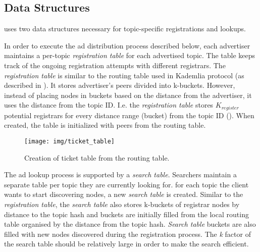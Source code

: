 \subsection{Data Structures}\label{sec:struct}
\sysname uses two data structures necessary for topic-specific registrations and lookups. 

In order to execute the ad distribution process described below,  each advertiser maintains a per-topic \emph{registration table} for each advertised topic. The table keeps track of the ongoing registration attempts with different registrars.  The \emph{registration table} is similar to the routing table used in Kademlia protocol (as described in ). It stores advertiser's peers divided into k-buckets. However, instead of placing nodes in buckets based on the distance from the advertiser, it uses the distance from the topic ID. I.e. the \emph{registration table} stores $K_\textit{register}$ potential registrars for every distance range (bucket) from the topic ID (). When created, the table is initialized with peers from the routing table. 

\begin{figure}
    \texttt{[image: img/ticket\_table]}
    \caption{Creation of ticket table from the routing table.}
    \label{fig:ticket_table}
 \end{figure}

The ad lookup process is supported by a \emph{search table}. 
Searchers maintain a separate table per topic they are currently looking for. 
\ie for each topic the client wants to start discovering nodes, a new \emph{search table} is created. 
Similar to the \emph{registration table}, the \emph{search table} also stores k-buckets of registrar nodes by distance to the topic hash and buckets are initially filled from the local routing table organised by the distance from the topic hash.
\emph{Search table} buckets are also filled with new nodes discovered during the registration process.
The \emph{k} factor of the search table should be relatively large in order to make the search efficient. 

